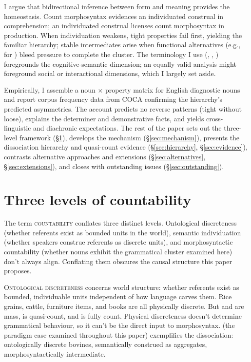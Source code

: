 \documentclass[12pt,a4paper]{article}
\begin{document}
I argue that bidirectional inference between form and meaning provides the homeostasis. Count morphosyntax evidences an individuated construal in comprehension; an individuated construal licenses count morphosyntax in production. When individuation weakens, tight properties fail first, yielding the familiar hierarchy; stable intermediates arise when functional alternatives (e.g.,  for ) bleed pressure to complete the cluster. The terminology I use (, , ) foregrounds the cognitive-semantic dimension; an equally valid analysis might foreground social or interactional dimensions, which I largely set aside.

Empirically, I assemble a noun $\times$ property matrix for English diagnostic nouns and report corpus frequency data from COCA \citep{davies2020coca} confirming the hierarchy's predicted asymmetries. The account predicts no reverse patterns (tight without loose), explains the determiner and demonstrative facts, and yields cross-linguistic and diachronic expectations. The rest of the paper sets out the three-level framework (\S\ref{sec:levels}), develops the mechanism (\S\ref{sec:mechanism}), presents the dissociation hierarchy and quasi-count evidence (\S\ref{sec:hierarchy}, \S\ref{sec:evidence}), contrasts alternative approaches and extensions (\S\ref{sec:alternatives}, \S\ref{sec:extensions}), and closes with outstanding issues (\S\ref{sec:outstanding}).

\section{Three levels of countability}\label{sec:levels}

The term \textsc{countability} conflates three distinct levels. Ontological discreteness (whether referents exist as bounded units in the world), semantic individuation (whether speakers construe referents as discrete units), and morphosyntactic countability (whether nouns exhibit the grammatical cluster examined here) don't always align. Conflating them obscures the causal structure this paper proposes.

\textsc{Ontological discreteness} concerns world structure: whether referents exist as bounded, individuable units independent of how language carves them. Rice grains, cattle, furniture items, and books are all physically discrete. But  and  are mass,  is quasi-count, and  is fully count. Physical discreteness doesn't determine grammatical behaviour, so it can't be the direct input to morphosyntax.  (the paradigm case examined throughout this paper) exemplifies the dissociation: ontologically discrete bovines, semantically construed as aggregates, morphosyntactically intermediate.
\end{document}
